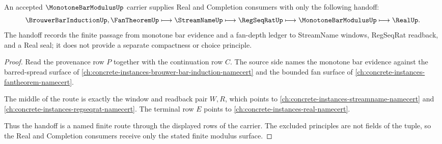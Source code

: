 \begin{theorem}
\label{thm:monotone-bar-modulus-real-handoff}
An accepted $\MonotoneBarModulusUp$ carrier supplies Real and Completion consumers with only the following handoff:
$$
\BrouwerBarInductionUp,\FanTheoremUp \longmapsto \StreamNameUp \longmapsto \RegSeqRatUp \longmapsto \MonotoneBarModulusUp \longmapsto \RealUp .
$$
The handoff records the finite passage from monotone bar evidence and a fan-depth ledger to StreamName windows, RegSeqRat readback, and a Real seal; it does not provide a separate compactness or choice principle.
\end{theorem}
\begin{proof}
Read the provenance row $P$ together with the continuation row $C$. The source side names the monotone bar evidence against the barred-spread surface of \autoref{ch:concrete-instances-brouwer-bar-induction-namecert} and the bounded fan surface of \autoref{ch:concrete-instances-fantheorem-namecert}.

The middle of the route is exactly the window and readback pair $W,R$, which points to \autoref{ch:concrete-instances-streamname-namecert} and \autoref{ch:concrete-instances-regseqrat-namecert}. The terminal row $E$ points to \autoref{ch:concrete-instances-real-namecert}.

Thus the handoff is a named finite route through the displayed rows of the carrier. The excluded principles are not fields of the tuple, so the Real and Completion consumers receive only the stated finite modulus surface.
\end{proof}




